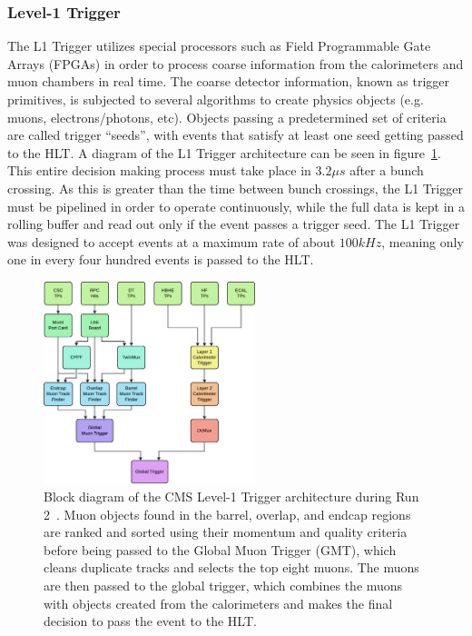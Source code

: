 \subsubsection{Level-1 Trigger} \label{sec:CMS_L1T}
The L1 Trigger utilizes special processors such as Field Programmable Gate Arrays (FPGAs) in order to process coarse information from the calorimeters and muon chambers in real time. The coarse detector information, known as trigger primitives, is subjected to several algorithms to create physics objects (e.g. muons, electrons/photons, etc). Objects passing a predetermined set of criteria are called trigger ``seeds'', with events that satisfy at least one seed getting passed to the HLT. A diagram of the L1 Trigger architecture can be seen in figure~\ref{fig:L1T}. This entire decision making process must take place in $3.2\unit{\mu s}$ after a bunch crossing. As this is greater than the time between bunch crossings, the L1 Trigger must be pipelined in order to operate continuously, while the full data is kept in a rolling buffer and read out only if the event passes a trigger seed. The L1 Trigger was designed to accept events at a maximum rate of about $100\unit{kHz}$, meaning only one in every four hundred events is passed to the HLT.

\begin{figure}[htpb]
	\centering
	\includegraphics[width=0.55\textwidth]{figs/03_experiment/cms_l1t.png}
	\caption[Block diagram of the CMS Level-1 Trigger architecture during Run 2. Muon objects found in the barrel, overlap, and endcap regions are ranked and sorted using their momentum and quality criteria before being passed to the Global Muon Trigger (GMT), which cleans duplicate tracks and selects the top eight muons. The muons are then passed to the global trigger, which combines the muons with objects created from the calorimeters and makes the final decision to pass the event to the HLT.]
	{Block diagram of the CMS Level-1 Trigger architecture during Run 2~\cite{Sirunyan:2721198}. Muon objects found in the barrel, overlap, and endcap regions are ranked and sorted using their momentum and quality criteria before being passed to the Global Muon Trigger (GMT), which cleans duplicate tracks and selects the top eight muons. The muons are then passed to the global trigger, which combines the muons with objects created from the calorimeters and makes the final decision to pass the event to the HLT.}
	\label{fig:L1T}
\end{figure}

